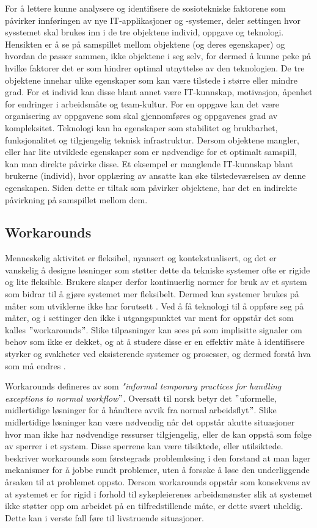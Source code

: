 \noindent
For å lettere kunne analysere og identifisere de sosiotekniske faktorene som påvirker innføringen av nye IT-applikasjoner og -systemer, deler \citet{FITT} settingen hvor sysstemet skal brukes inn i de tre objektene individ, oppgave og teknologi. Hensikten er å se på samspillet mellom objektene (og deres egenskaper) og hvordan de passer sammen, ikke objektene i seg selv, for dermed å kunne peke på hvilke faktorer det er som hindrer optimal utnyttelse av den teknologien. De tre objektene innehar ulike egenskaper som kan være tilstede i større eller mindre grad. For et individ kan disse blant annet være IT-kunnskap, motivasjon, åpenhet for endringer i arbeidsmåte og team-kultur. For en oppgave kan det være organisering av oppgavene som skal gjennomføres og oppgavenes grad av kompleksitet. Teknologi kan ha egenskaper som stabilitet og brukbarhet, funksjonalitet og tilgjengelig teknisk infrastruktur. Dersom objektene mangler, eller har lite utviklede egenskaper som er nødvendige for et optimalt samspill, kan man direkte påvirke disse. Et eksempel er manglende IT-kunnskap blant brukerne (individ), hvor opplæring av ansatte kan øke tilstedeværelsen av denne egenskapen. Siden dette er tiltak som påvirker objektene, har det en indirekte påvirkning på samspillet mellom dem. 

\subsection{Workarounds}
\label{sec:workarounds}
Menneskelig aktivitet er fleksibel, nyansert og kontekstualisert, og det er vanskelig å designe løsninger som støtter dette da tekniske systemer ofte er rigide og lite fleksible. Brukere skaper derfor kontinuerlig normer for bruk av et system som bidrar til å gjøre systemet mer fleksibelt. Dermed kan systemer brukes på måter som utviklerne ikke har forutsett \citep{Ackermann00}. Ved å få teknologi til å oppføre seg på måter, og i settinger den ikke i utgangspunktet var ment for oppstår det som kalles $"$workarounds$"$. Slike tilpasninger kan sees på som implisitte signaler om behov som ikke er dekket, og at å studere disse er en effektiv måte å identifisere styrker og svakheter ved eksisterende systemer og prosesser, og dermed forstå hva som må endres \citep{Coiera07}. 

\noindent
Workarounds defineres av \citet{Kobayashi05} som \emph{"informal temporary practices for handling exceptions to normal workflow$"$}. Oversatt til norsk betyr det $"$uformelle, midlertidige løsninger for å håndtere avvik fra normal arbeidsflyt$"$. Slike midlertidige løsninger kan være nødvendig når det oppstår akutte situasjoner hvor man ikke har nødvendige ressurser tilgjengelig, eller de kan oppstå som følge av sperrer i et system. Disse sperrene kan være tilsiktede, eller utilsiktede. \citet{Vogelsmeier08} beskriver workarounds som førstegrads problemløsing i den forstand at man lager mekanismer for å jobbe rundt problemer, uten å forsøke å løse den underliggende årsaken til at problemet oppsto. Dersom workarounds oppstår som konsekvens av at systemet er for rigid i forhold til sykepleierenes arbeidsmønster slik at systemet ikke støtter opp om arbeidet på en tilfredstillende måte, er dette svært uheldig. Dette kan i verste fall føre til livstruende situasjoner.

